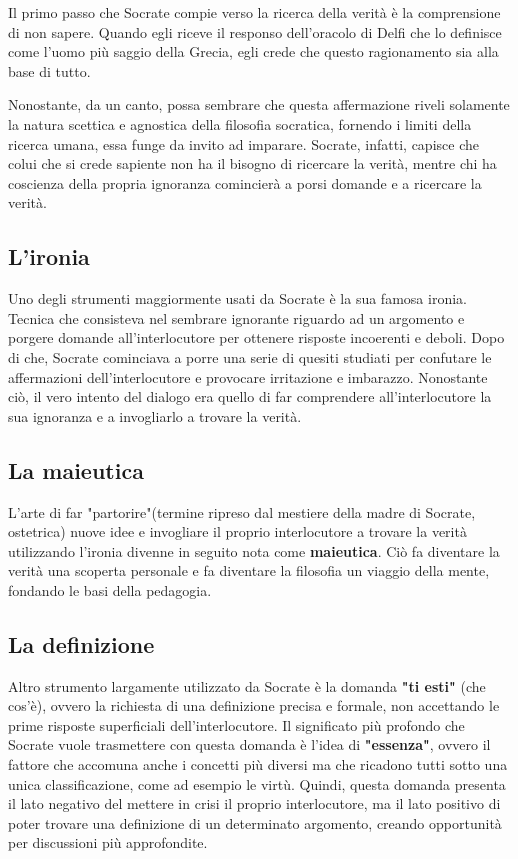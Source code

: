 \documentclass[10pt,a4paper]{article}
\begin{document}
	Il primo passo che Socrate compie verso la ricerca della verità è la comprensione di non sapere. Quando egli riceve il responso dell'oracolo di Delfi che lo definisce come l'uomo più saggio della Grecia, egli crede che questo ragionamento sia alla base di tutto.
	
	Nonostante, da un canto, possa sembrare che questa affermazione riveli solamente la natura scettica e agnostica della filosofia socratica, fornendo i limiti della ricerca umana, essa funge da invito ad imparare. Socrate, infatti, capisce che colui che si crede sapiente non ha il bisogno di ricercare la verità, mentre chi ha coscienza della propria ignoranza comincierà a porsi domande e a ricercare la verità.
	
	\subsection{L'ironia}
	
	Uno degli strumenti maggiormente usati da Socrate è la sua famosa ironia. Tecnica che consisteva nel sembrare ignorante riguardo ad un argomento e porgere domande all'interlocutore per ottenere risposte incoerenti e deboli. Dopo di che, Socrate cominciava a porre una serie di quesiti studiati per confutare le affermazioni dell'interlocutore e provocare irritazione e imbarazzo. Nonostante ciò, il vero intento del dialogo era quello di far comprendere all'interlocutore la sua ignoranza e a invogliarlo a trovare la verità.
	
	\subsection{La maieutica}
	
	L'arte di far "partorire"(termine ripreso dal mestiere della madre di Socrate, ostetrica) nuove idee e invogliare il proprio interlocutore a trovare la verità utilizzando l'ironia divenne in seguito nota come \textbf{maieutica}. Ciò fa diventare la verità una scoperta personale e fa diventare la filosofia un viaggio della mente, fondando le basi della pedagogia.
	
	\subsection{La definizione}
	
	Altro strumento largamente utilizzato da Socrate è la domanda \textbf{"ti esti"} (che cos'è), ovvero la richiesta di una definizione precisa e formale, non accettando le prime risposte superficiali dell'interlocutore. Il significato più profondo che Socrate vuole trasmettere con questa domanda è l'idea di \textbf{"essenza"}, ovvero il fattore che accomuna anche i concetti più diversi ma che ricadono tutti sotto una unica classificazione, come ad esempio le virtù. Quindi, questa domanda presenta il lato negativo del mettere in crisi il proprio interlocutore, ma il lato positivo di poter trovare una definizione di un determinato argomento, creando opportunità per discussioni più approfondite.
	
\end{document}
